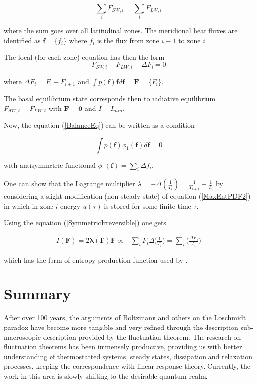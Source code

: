 \documentclass[a4paper,12pt]{article}
\begin{document}
\begin{equation}
\label{BalanceEq}
  \sum_i F_{SW,i}= \sum_i F_{LW,i}
\end{equation}
  
  where the sum goes over all latitudinal zones. The meridional heat fluxes are identified as $\bm{f}=\{f_i\}$ where $f_i$ is the flux from zone $i-1$ to zone $i$. 

The local (for each zone) equation has then the form
\begin{equation}
  F_{SW,i}- F_{LW,i} + \Delta F_i = 0
\end{equation}

where $\Delta F_i = F_i - F_{i+1}$ and $\int p(\bm{f})\bm{f} d\bm{f}=\bm{F}=\{F_i\}$. 

The basal equilibrium state corresponds then to radiative equilibrium $F_{SW,i}= F_{LW,i}$ with $\bm{F}=\bm{0}$ and $I=I_{min}$.

Now, the equation (\ref{BalanceEq}) can be written as a condition

\begin{equation}
  \int p(\bm{f})\phi_1(\bm{f})d\bm{f} =0
\end{equation}

with antisymmetric functional $\phi_1(\bm{f})=\sum_i \Delta f_i$. 

One can show that the Lagrange multiplier $\lambda = - \Delta (\frac{1}{T_i}) = \frac{1}{T_{i+1}}-\frac{1}{T_i}$ by considering a slight modification (non-steady state) of equation (\ref{MaxEntPDF2}) in which in zone $i$ energy $u(\tau)$ is stored for some finite time $\tau$\cite{Dewar:2014ek}. 

Using the equation (\ref{SymmetricIrreversible}) one gets

\begin{equation}
\begin{aligned}
  I(\bm{F})=2 \bm{\lambda}(\bm{F})\bm{F} \propto - \sum_i F_i \Delta\bigg(\frac{1}{T_i}\bigg)= \sum_i \bigg(\frac{\Delta F_i}{T_i}\bigg)
\end{aligned}
\end{equation}

which has the form of entropy production function used by \cite{Paltridge:2007jf}\cite{Lorenz:J80tzZkl}.
  
\section{Summary}

After over 100 years, the arguments of Boltzmann and others on the Loschmidt paradox have become more tangible and very refined through the description sub-macroscopic description provided by the fluctuation theorem.
The research on fluctuation theorems has been immensely productive, providing us with better understanding of thermostatted systems, steady states, dissipation and relaxation processes, keeping the correspondence with linear response theory. Currently, the work in this area is slowly shifting to the desirable quantum realm\cite{Kurchan:2000uh}.
\end{document}
